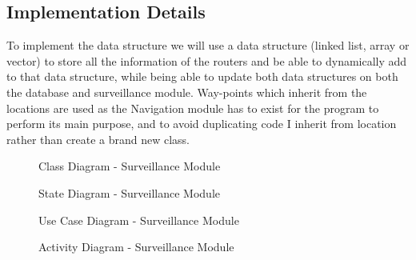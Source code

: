 \documentclass[english]{article}
\begin{document}
        \subsection{Implementation Details}    
            To implement the data structure we will use a data structure (linked list, array or vector) to store all the information of the routers and be able to dynamically add to that data structure, while being able to update both data structures on both the database and surveillance module. Way-points which inherit from the locations are  used as the Navigation module has to exist for the program to perform its main purpose, and to avoid duplicating code I inherit from location rather than create a brand new class.

        \begin{figure}[H]
            \centering	            
            \centerline{}
            \caption{Class Diagram - Surveillance Module}
        \end{figure}

        \begin{figure}[H]
            \centering	            
            \centerline{}
            \caption{State Diagram - Surveillance Module}
        \end{figure}

        \begin{figure}[H]
            \centering	            
            \centerline{}
            \caption{Use Case Diagram - Surveillance Module}
        \end{figure}  
        
        \begin{figure}[H]
            \centering	            
            \centerline{}
            \caption{Activity Diagram - Surveillance Module}
        \end{figure}    
\end{document}
